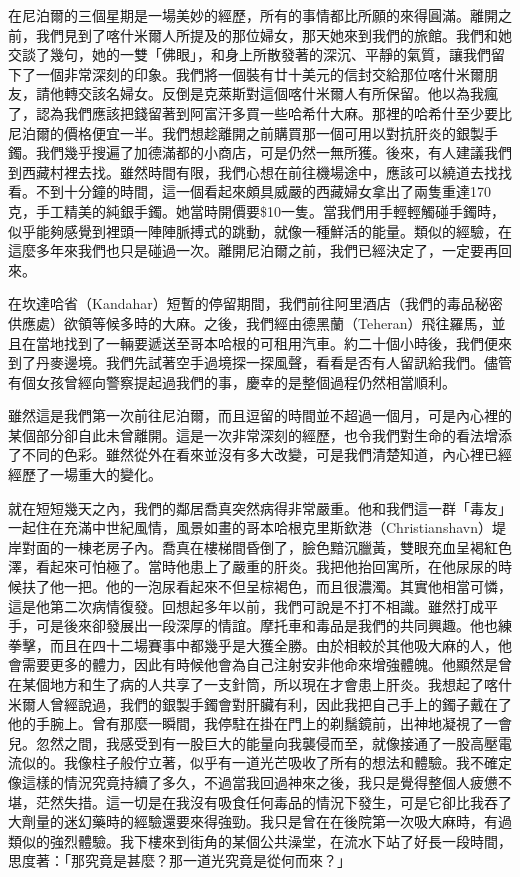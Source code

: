 在尼泊爾的三個星期是一場美妙的經歷，所有的事情都比所願的來得圓滿。離開之前，我們見到了喀什米爾人所提及的那位婦女，那天她來到我們的旅館。我們和她交談了幾句，她的一雙「佛眼」，和身上所散發著的深沉、平靜的氣質，讓我們留下了一個非常深刻的印象。我們將一個裝有廿十美元的信封交給那位喀什米爾朋友，請他轉交該名婦女。反倒是克萊斯對這個喀什米爾人有所保留。他以為我瘋了，認為我們應該把錢留著到阿富汗多買一些哈希什大麻。那裡的哈希什至少要比尼泊爾的價格便宜一半。我們想趁離開之前購買那一個可用以對抗肝炎的銀製手鐲。我們幾乎搜遍了加德滿都的小商店，可是仍然一無所獲。後來，有人建議我們到西藏村裡去找。雖然時間有限，我們心想在前往機場途中，應該可以繞道去找找看。不到十分鐘的時間，這一個看起來頗具威嚴的西藏婦女拿出了兩隻重達170克，手工精美的純銀手鐲。她當時開價要\$10一隻。當我們用手輕輕觸碰手鐲時，似乎能夠感覺到裡頭一陣陣脈搏式的跳動，就像一種鮮活的能量。類似的經驗，在這麼多年來我們也只是碰過一次。離開尼泊爾之前，我們已經決定了，一定要再回來。

在坎達哈省（Kandahar）短暫的停留期間，我們前往阿里酒店（我們的毒品秘密供應處）欲領等候多時的大麻。之後，我們經由德黑蘭（Teheran）飛往羅馬，並且在當地找到了一輛要遞送至哥本哈根的可租用汽車。約二十個小時後，我們便來到了丹麥邊境。我們先試著空手過境探一探風聲，看看是否有人留訊給我們。儘管有個女孩曾經向警察提起過我們的事，慶幸的是整個過程仍然相當順利。

雖然這是我們第一次前往尼泊爾，而且逗留的時間並不超過一個月，可是內心裡的某個部分卻自此未曾離開。這是一次非常深刻的經歷，也令我們對生命的看法增添了不同的色彩。雖然從外在看來並沒有多大改變，可是我們清楚知道，內心裡已經經歷了一場重大的變化。

就在短短幾天之內，我們的鄰居喬真突然病得非常嚴重。他和我們這一群「毒友」一起住在充滿中世紀風情，風景如畫的哥本哈根克里斯欽港（Christianshavn）堤岸對面的一棟老房子內。喬真在樓梯間昏倒了，臉色黯沉臘黃，雙眼充血呈褐紅色澤，看起來可怕極了。當時他患上了嚴重的肝炎。我把他抬回寓所，在他尿尿的時候扶了他一把。他的一泡尿看起來不但呈棕褐色，而且很濃濁。其實他相當可憐，這是他第二次病情復發。回想起多年以前，我們可說是不打不相識。雖然打成平手，可是後來卻發展出一段深厚的情誼。摩托車和毒品是我們的共同興趣。他也練拳擊，而且在四十二場賽事中都幾乎是大獲全勝。由於相較於其他吸大麻的人，他會需要更多的體力，因此有時候他會為自己注射安非他命來增強體魄。他顯然是曾在某個地方和生了病的人共享了一支針筒，所以現在才會患上肝炎。我想起了喀什米爾人曾經說過，我們的銀製手鐲會對肝臟有利，因此我把自己手上的鐲子戴在了他的手腕上。曾有那麼一瞬間，我停駐在掛在門上的剃鬚鏡前，出神地凝視了一會兒。忽然之間，我感受到有一股巨大的能量向我襲侵而至，就像接通了一股高壓電流似的。我像柱子般佇立著，似乎有一道光芒吸收了所有的想法和體驗。我不確定像這樣的情況究竟持續了多久，不過當我回過神來之後，我只是覺得整個人疲憊不堪，茫然失措。這一切是在我沒有吸食任何毒品的情況下發生，可是它卻比我吞了大劑量的迷幻藥時的經驗還要來得強勁。我只是曾在在後院第一次吸大麻時，有過類似的強烈體驗。我下樓來到街角的某個公共澡堂，在流水下站了好長一段時間，思度著：「那究竟是甚麼？那一道光究竟是從何而來？」

